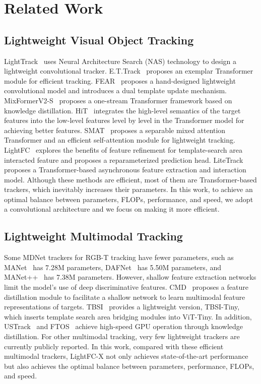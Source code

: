 \section{Related Work}
\label{sec:related}


\subsection{Lightweight Visual Object Tracking}
LightTrack~\cite{litetrack} uses Neural Architecture Search (NAS) technology to design a lightweight convolutional tracker. E.T.Track~\cite{ettrack} proposes an exemplar Transformer module for efficient tracking. FEAR~\cite{fear} proposes a hand-designed lightweight convolutional model and introduces a dual template update mechanism. MixFormerV2-S~\cite{mixformerv2s} proposes a one-stream Transformer framework based on knowledge distillation. HiT~\cite{hit} integrates the high-level semantics of the target features into the low-level features level by level in the Transformer model for achieving better features. SMAT~\cite{smat} proposes a separable mixed attention Transformer and an efficient self-attention module for lightweight tracking. LightFC~\cite{lightfc} explores the benefits of feature refinement for template-search area interacted feature and proposes a reparameterized prediction head. LiteTrack~\cite{litetrack} proposes a Transformer-based asynchronous feature extraction and interaction model. Although these methods are efficient, most of them are Transformer-based trackers, which inevitably increases their parameters. In this work, to achieve an optimal balance between parameters, FLOPs, performance, and speed, we adopt a convolutional architecture and we focus on making it more efficient.



\subsection{Lightweight Multimodal Tracking}
Some MDNet trackers for RGB-T tracking have fewer parameters, such as MANet~\cite{manet} has 7.28M parameters, DAFNet~\cite{dafnet} has 5.50M parameters, and MANet++~\cite{manetpp} has 7.38M parameters. However, shallow feature extraction networks limit the model's use of deep discriminative features. CMD~\cite{cmd} proposes a feature distillation module to facilitate a shallow network to learn multimodal feature representations of targets. TBSI~\cite{tbsi} provides a lightweight version, TBSI-Tiny, which inserts template search area bridging modules into ViT-Tiny. In addition, USTrack~\cite{ustrack} and FTOS~\cite{ftos} achieve high-speed GPU operation through knowledge distillation.
For other multimodal tracking, very few lightweight trackers are currently publicly reported. 
In this work, compared with these efficient multimodal trackers, LightFC-X not only achieves state-of-the-art performance but also achieves the optimal balance between parameters, performance, FLOPs, and speed.

